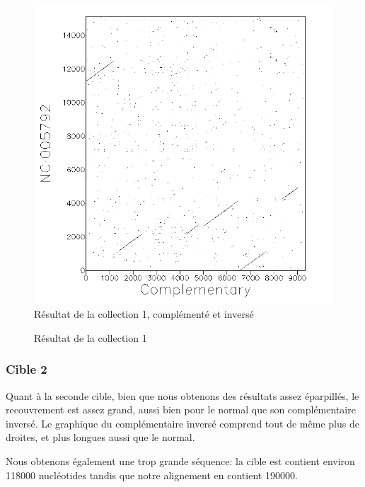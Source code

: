 \begin{figure}[!ht]
\begin{minipage}[c]{.46 \linewidth}
\begin{center}
			\includegraphics[scale= 0.4]{../res/cible1-ic.png}
			Résultat de la collection 1, complémenté et inversé
		\end{center}
	\end{minipage}
	\caption{Résultat de la collection 1}
\end{figure}

\FloatBarrier

\subsubsection*{Cible 2}

Quant à la seconde cible, bien que nous obtenons des résultats assez éparpillés,
le recouvrement est assez grand, aussi bien pour le normal que son
complémentaire inversé.
Le graphique du complémentaire inversé comprend tout de même plus de droites, et
plus longues aussi que le normal.

Nous obtenons également une trop grande séquence: la cible est contient environ
118000 nucléotides tandis que notre alignement en contient 190000.

